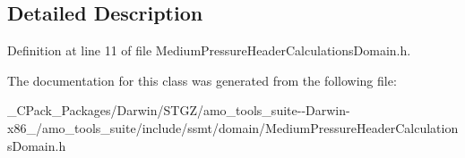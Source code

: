 \subsection{Detailed Description}


Definition at line 11 of file Medium\+Pressure\+Header\+Calculations\+Domain.\+h.



The documentation for this class was generated from the following file\+:\begin{DoxyCompactItemize}
\item 
\+\_\+\+C\+Pack\+\_\+\+Packages/\+Darwin/\+S\+T\+G\+Z/amo\+\_\+tools\+\_\+suite-\/-\/\+Darwin-\/x86\+\_/amo\+\_\+tools\+\_\+suite/include/ssmt/domain/Medium\+Pressure\+Header\+Calculations\+Domain.\+h\end{DoxyCompactItemize}
